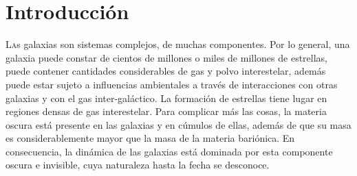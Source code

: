 

\chapter{Introducción}



\lettrine[lines=1]{L}as galaxias son sistemas complejos, de muchas componentes. Por lo general, una galaxia puede constar
de cientos de millones o miles de millones de estrellas, puede contener cantidades considerables de gas
y polvo interestelar, además puede estar sujeto a influencias ambientales a través de interacciones con otras galaxias
y con el gas inter-galáctico. La formación de estrellas tiene lugar en regiones densas de gas interestelar.
Para complicar más las cosas, la materia oscura está presente en las galaxias y en cúmulos de ellas, además de que
su masa es considerablemente mayor que la masa de la materia bariónica. En consecuencia, la dinámica de las galaxias
está dominada por esta componente oscura e invisible, cuya naturaleza hasta la fecha se desconoce.


